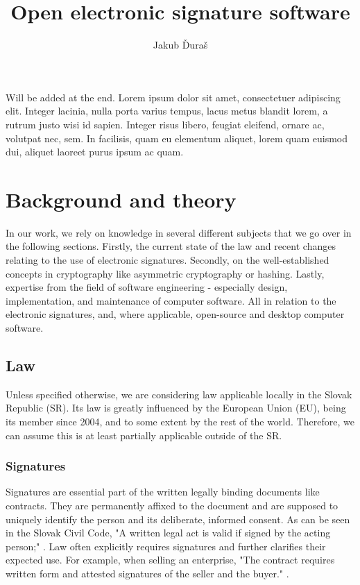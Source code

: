 \documentclass[thesismargins, english, thesislinespacing, twoside, openright, upjsfrontpage]{rnthesis}
\title{Open electronic signature software}
\author{Jakub Ďuraš}
\begin{document}
\maketitle
\newpage
\tableofcontents
\listoffigures
\listoftables

\uvod

Will be added at the end. Lorem ipsum dolor sit amet, consectetuer adipiscing elit.
Integer lacinia, nulla porta varius tempus, lacus metus blandit
lorem, a rutrum justo wisi id sapien. Integer risus libero,
feugiat eleifend, ornare ac, volutpat nec, sem. In facilisis,
quam eu elementum aliquet, lorem quam euismod dui, aliquet
laoreet purus ipsum ac quam.


\chapter{Background and theory}

In our work, we rely on knowledge in several different subjects that we go over in the following sections.
Firstly, the current state of the law and recent changes relating to the use of electronic signatures.
Secondly, on the well-established concepts in cryptography like asymmetric cryptography or hashing.
Lastly, expertise from the field of software engineering - especially design, implementation, and maintenance of computer software.
All in relation to the electronic signatures, and, where applicable, open-source and desktop computer software.

\section{Law}

Unless specified otherwise, we are considering law applicable locally in the Slovak Republic (SR).
Its law is greatly influenced by the European Union (EU), being its member since 2004, and to some extent by the rest of the world.
Therefore, we can assume this is at least partially applicable outside of the SR.

\subsection{Signatures}

Signatures are essential part of the written legally binding documents like contracts.
They are permanently affixed to the document and are supposed to uniquely identify the person and its deliberate, informed consent.
As can be seen in the Slovak Civil Code, "A written legal act is valid if signed by the acting person;" \cite{1}.
Law often explicitly requires signatures and further clarifies their expected use.
For example, when selling an enterprise, "The contract requires written form and attested signatures of the seller and the buyer." \cite{2}.
\end{document}

